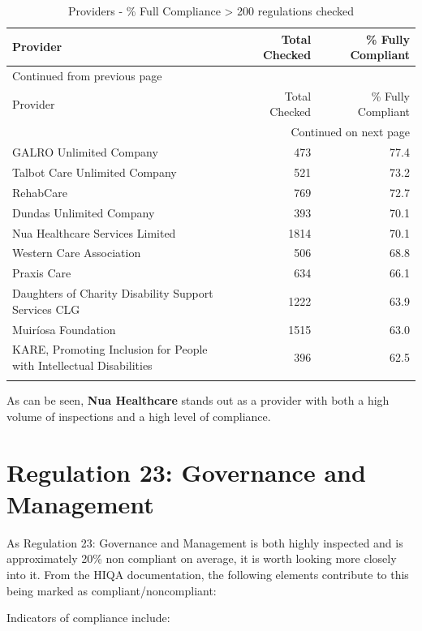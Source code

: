 \documentclass[a4paper,11pt,twoside]{article}
\begin{document}
\begin{longtable}{p{10cm}|r|r}
\caption{Providers - \% Full Compliance > 200 regulations checked}
\\[0pt]
Provider & Total Checked & \% Fully Compliant\\[0pt]
\hline
\endfirsthead
\multicolumn{3}{l}{Continued from previous page} \\[0pt]
\hline

Provider & Total Checked & \% Fully Compliant \\[0pt]

\hline
\endhead
\hline\multicolumn{3}{r}{Continued on next page} \\
\endfoot
\endlastfoot
\hline
GALRO Unlimited Company & 473 & 77.4\\[0pt]
Talbot Care Unlimited Company & 521 & 73.2\\[0pt]
RehabCare & 769 & 72.7\\[0pt]
Dundas Unlimited Company & 393 & 70.1\\[0pt]
Nua Healthcare Services Limited & 1814 & 70.1\\[0pt]
Western Care Association & 506 & 68.8\\[0pt]
Praxis Care & 634 & 66.1\\[0pt]
Daughters of Charity Disability Support Services CLG & 1222 & 63.9\\[0pt]
Muiríosa Foundation & 1515 & 63.0\\[0pt]
KARE, Promoting Inclusion for People with Intellectual Disabilities & 396 & 62.5\\[0pt]
 &  & \\[0pt]
\end{longtable}


As can be seen, \textbf{Nua Healthcare} stands out as a provider with both a high volume of inspections and a high level of compliance.
\section{Regulation 23: Governance and Management}
\label{sec:orgab3af12}

As Regulation 23: Governance and Management is both highly inspected and is approximately 20\% non compliant on average, it is worth looking more closely into it. From the HIQA documentation, the following elements contribute to this being marked as compliant/noncompliant:

Indicators of compliance include:
\end{document}

